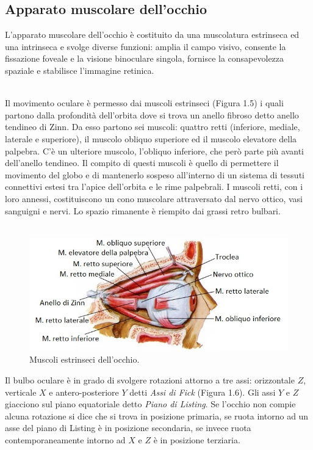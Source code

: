 \subsection{Apparato muscolare dell'occhio}

L’apparato muscolare dell'occhio è costituito da una muscolatura estrinseca ed una intrinseca e svolge diverse funzioni: amplia il campo visivo, consente la fissazione foveale e la visione binoculare singola, fornisce la consapevolezza spaziale e stabilisce l'immagine retinica.
\\\
 
Il movimento oculare è permesso dai muscoli estrinseci (Figura 1.5) i quali partono dalla profondità dell’orbita dove si trova un anello fibroso detto anello tendineo di Zinn. Da esso partono sei muscoli: quattro retti (inferiore, mediale, laterale e superiore), il muscolo obliquo superiore ed il muscolo elevatore della palpebra. C’è un ulteriore muscolo, l’obliquo inferiore, che però parte più avanti dell’anello tendineo. Il compito di questi muscoli è quello di permettere il movimento del globo e di mantenerlo sospeso all’interno di un sistema di tessuti connettivi estesi tra l’apice dell’orbita e le rime palpebrali. I muscoli retti, con i loro annessi, costituiscono un cono muscolare attraversato dal nervo ottico, vasi sanguigni e nervi. Lo spazio rimanente è riempito dai grassi retro bulbari\cite{bib3}. 
\\\
\begin{figure}[h!]
	\centering
	\includegraphics[scale=2.7]{source/immagini/muscoli_estrinseci_occhio.jpg}
	\caption[Muscoli estrinseci dell'occhio]{Muscoli estrinseci dell'occhio.}
	\label{fig:test6}
\end{figure}

Il bulbo oculare è in grado di svolgere rotazioni attorno a tre assi: orizzontale $Z$, verticale $X$ e antero-posteriore $Y$ detti \emph{Assi di Fick} (Figura 1.6). Gli assi $Y$ e $Z$ giacciono sul piano equatoriale detto \emph{Piano di Listing}. Se l’occhio non compie alcuna rotazione si dice che si trova in posizione primaria, se ruota intorno ad un asse del piano di Listing  è in posizione secondaria, se invece ruota contemporaneamente intorno ad $X$ e $Z$ è in posizione terziaria\cite{bib16}.

